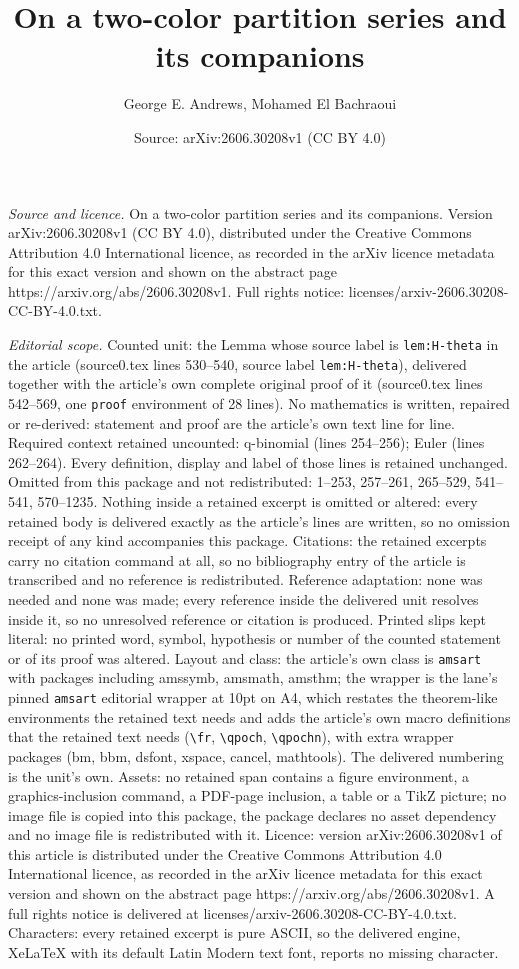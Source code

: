\documentclass[10pt,a4paper]{amsart}
\title[On a two-color partition series and its companions]{On a two-color partition series and its companions}
\author{George E. Andrews, Mohamed El Bachraoui}
\date{Source: arXiv:2606.30208v1 (CC BY 4.0)}
\begin{document}
\maketitle

\noindent\emph{Source and licence.} On a two-color partition series and its companions. Version arXiv:2606.30208v1 (CC BY 4.0), distributed under the Creative Commons Attribution 4.0 International licence, as recorded in the arXiv licence metadata for this exact version and shown on the abstract page https://arxiv.org/abs/2606.30208v1. Full rights notice: licenses/arxiv-2606.30208-CC-BY-4.0.txt.\par\smallskip

\noindent\textit{Editorial scope.} Counted unit: the Lemma whose source label is \texttt{lem:H-theta} in the article (source0.tex lines 530--540, source label \texttt{lem:H-theta}), delivered together with the article's own complete original proof of it (source0.tex lines 542--569, one \texttt{proof} environment of 28 lines). No mathematics is written, repaired or re-derived: statement and proof are the article's own text line for line. Required context retained uncounted: q-binomial (lines 254--256); Euler (lines 262--264). Every definition, display and label of those lines is retained unchanged. Omitted from this package and not redistributed: 1--253, 257--261, 265--529, 541--541, 570--1235. Nothing inside a retained excerpt is omitted or altered: every retained body is delivered exactly as the article's lines are written, so no omission receipt of any kind accompanies this package. Citations: the retained excerpts carry no citation command at all, so no bibliography entry of the article is transcribed and no reference is redistributed. Reference adaptation: none was needed and none was made; every reference inside the delivered unit resolves inside it, so no unresolved reference or citation is produced. Printed slips kept literal: no printed word, symbol, hypothesis or number of the counted statement or of its proof was altered. Layout and class: the article's own class is \texttt{amsart} with packages including amssymb, amsmath, amsthm; the wrapper is the lane's pinned \texttt{amsart} editorial wrapper at 10pt on A4, which restates the theorem-like environments the retained text needs and adds the article's own macro definitions that the retained text needs (\texttt{\textbackslash fr}, \texttt{\textbackslash qpoch}, \texttt{\textbackslash qpochn}), with extra wrapper packages (bm, bbm, dsfont, xspace, cancel, mathtools). The delivered numbering is the unit's own. Assets: no retained span contains a figure environment, a graphics-inclusion command, a PDF-page inclusion, a table or a TikZ picture; no image file is copied into this package, the package declares no asset dependency and no image file is redistributed with it. Licence: version arXiv:2606.30208v1 of this article is distributed under the Creative Commons Attribution 4.0 International licence, as recorded in the arXiv licence metadata for this exact version and shown on the abstract page https://arxiv.org/abs/2606.30208v1. A full rights notice is delivered at licenses/arxiv-2606.30208-CC-BY-4.0.txt. Characters: every retained excerpt is pure ASCII, so the delivered engine, XeLaTeX with its default Latin Modern text font, reports no missing character.
\end{document}

